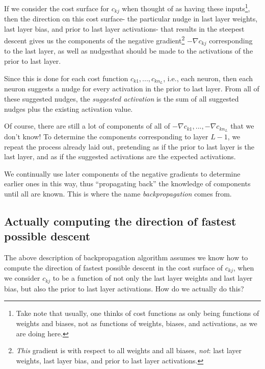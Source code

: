 \documentclass{article}
\begin{document}
	If we consider the cost surface for $c_{kj}$ when thought of as having these inputs\footnote{Take note that usually, one thinks of cost functions as only being functions of weights and biases, not as functions of weights, biases, and activations, as we are doing here.}, then the direction on this cost surface- the particular nudge in last layer weights, last layer bias, and prior to last layer activations- that results in the steepest descent gives us the components of the negative gradient\footnote{\textit{This} gradient is with respect to all weights and all biases, \textit{not}: last layer weights, last layer bias, and prior to last layer activations.} $-\nabla c_{kj}$ corresponding to the last layer, as well as nudges\footnotemark that should be made to the activations of the prior to last layer.
	
	
	Since this is done for each cost function $c_{k1}, ..., c_{kn_L}$, i.e., each neuron, then each neuron suggests a nudge for every activation in the prior to last layer. From all of these suggested nudges, the \textit{suggested activation} is the sum of all suggested nudges plus the existing activation value.
	
	Of course, there are still a lot of components of all of $-\nabla c_{k1}, ..., -\nabla c_{kn_L}$ that we don't know! To determine the components corresponding to layer $L - 1$, we repeat the process already laid out, pretending as if the prior to last layer is the last layer, and as if the suggested activations are the expected activations.
	
	We continually use later components of the negative gradients to determine earlier ones in this way, thus ``propagating back'' the knowledge of components until all are known. This is where the name \textit{backpropagation} comes from.
	
	\subsection*{Actually computing the direction of fastest possible descent}
	
	The above description of backpropagation algorithm assumes we know how to compute the direction of fastest possible descent in the cost surface of $c_{kj}$, when we consider $c_{kj}$ to be a function of not only the last layer weights and last layer bias, but also the prior to last layer activations. How do we actually do this?
	
\end{document}
